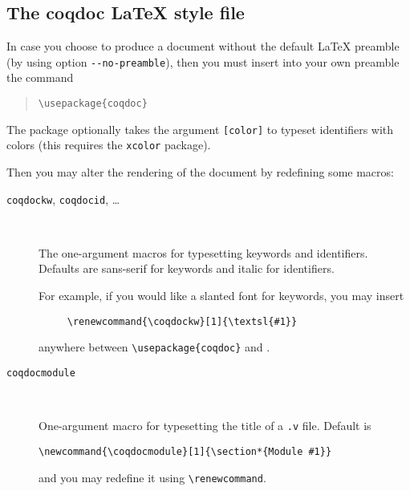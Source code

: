 \subsection[The coqdoc \LaTeX{} style file]{The coqdoc \LaTeX{} style file\label{section:coqdoc.sty}}

In case you choose to produce a document without the default \LaTeX{}
preamble (by using option \verb|--no-preamble|), then you must insert
into your own preamble the command
\begin{quote}
  \verb|\usepackage{coqdoc}|
\end{quote}

The package optionally takes the argument \verb|[color]| to typeset
identifiers with colors (this requires the \verb|xcolor| package).

Then you may alter the rendering of the document by
redefining some macros:
\begin{description}

\item[\texttt{coqdockw}, \texttt{coqdocid}, \ldots] ~

  The one-argument macros for typesetting keywords and identifiers.
  Defaults are sans-serif for keywords and italic for identifiers.

  For example, if you would like a slanted font for keywords, you
  may insert
\begin{verbatim}
     \renewcommand{\coqdockw}[1]{\textsl{#1}}
\end{verbatim}
  anywhere between \verb|\usepackage{coqdoc}| and
  \verb||.

\item[\texttt{coqdocmodule}] ~

  One-argument macro for typesetting the title of a \verb|.v| file.
  Default is
\begin{verbatim}
\newcommand{\coqdocmodule}[1]{\section*{Module #1}}
\end{verbatim}
  and you may redefine it using \verb|\renewcommand|.

\end{description}


